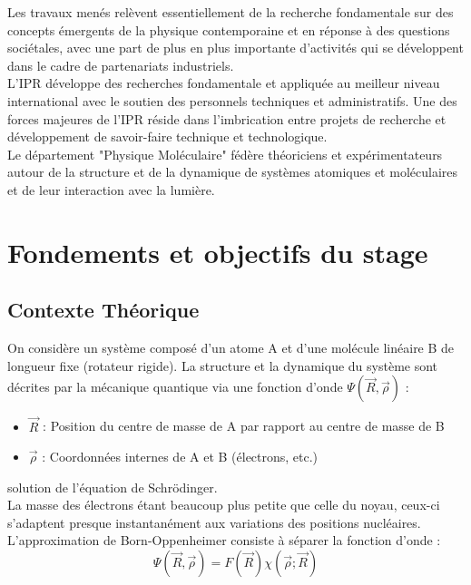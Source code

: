 \documentclass[11pt, a4paper, openany]{report}
\begin{document}
\noindent Les travaux menés relèvent essentiellement de la recherche fondamentale sur des
concepts émergents de la physique contemporaine et en réponse à des questions
sociétales, avec une part de plus en plus importante d’activités qui se 
développent dans le cadre de partenariats industriels.\\

\noindent L'IPR développe des recherches fondamentale et appliquée au meilleur niveau 
international avec le soutien des personnels techniques et administratifs. 
Une des forces majeures de l’IPR réside dans l’imbrication entre projets de recherche 
et développement de savoir-faire technique et technologique.\\

\noindent Le département "Physique Moléculaire" fédère théoriciens et 
expérimentateurs autour de la structure et de la dynamique de systèmes 
atomiques et moléculaires et de leur interaction avec la lumière.\\



\chapter{Fondements et objectifs du stage}

\section{Contexte Théorique}

\noindent On considère un système composé d'un atome A et d'une molécule 
linéaire B de longueur fixe (rotateur rigide). La structure et la dynamique du
système sont décrites par la mécanique quantique via une fonction d'onde 
$\Psi(\vec{R}, \vec{\rho})$ :
\begin{itemize}
  \item $\vec{R}$ : Position du centre de masse de A par rapport au centre de masse de B 
  \item $\vec{\rho}$ : Coordonnées internes de A et B (électrons, etc.)
\end{itemize}
solution de l'équation de Schrödinger.\\

\noindent La masse des électrons étant beaucoup plus petite que celle du noyau,
ceux-ci s’adaptent presque instantanément aux variations des positions nucléaires.
L’approximation de Born-Oppenheimer consiste à séparer la fonction d’onde :
$$\Psi(\vec{R}, \vec{\rho}) = F(\vec{R})\chi(\vec{\rho}; \vec{R})$$
\end{document}
